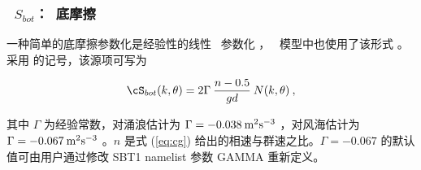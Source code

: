 \vsssub
\subsubsection{~$S_{bot}$：\js\ 底摩擦} \label{sec:BT1}
\vsssub


\noindent
一种简单的底摩擦参数化是经验性的线性 \js\ 参数化 \citep{art:JONSWAP}，
\wam\ 模型中也使用了该形式 \citep{art:WAM88}。采用 \cite{tol:JPO91b}
的记号，该源项可写为


\begin{equation}
\cS_{bot}(k,\theta) = 2 \Gamma \: \frac{n-0.5}{gd} \: N(k,\theta)
\: , \label{eq:JONSWAP_bot}
\end{equation}

\noindent
其中 $\Gamma$ 为经验常数，对涌浪估计为 $\Gamma =
-0.038\:\mbox m^2 \mbox s ^{-3}$ \citep{art:JONSWAP}，对风海估计为
$\Gamma = -0.067\:\mbox m^2 \mbox s^{-3}$ \citep{art:BK83}。$n$ 是式
(\ref{eq:cg}) 给出的相速与群速之比。$\Gamma = -0.067$ 的默认值可由用户通过修改
{\F SBT1} namelist 参数 {\code GAMMA} 重新定义。
